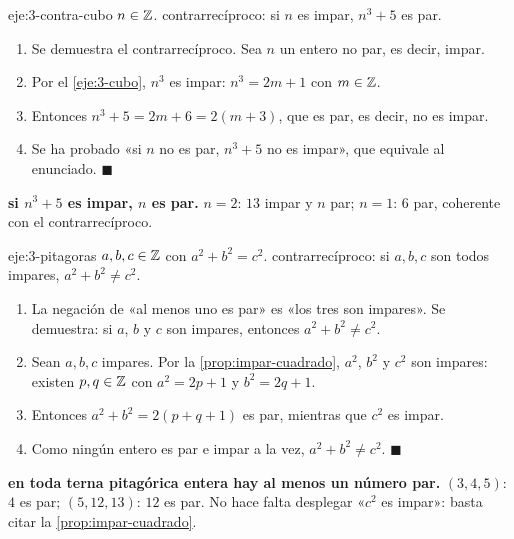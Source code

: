 \begin{solucion}{eje:3-contra-cubo}
\datos $n\in\mathbb{Z}$.
\planteamiento contrarrecíproco: si $n$ es impar, $n^{3}+5$ es par.
\pasos
\begin{enumerate}[label=\arabic*.]
  \item Se demuestra el contrarrecíproco. Sea $n$ un entero no par, es decir, impar.
  \item Por el \cref{eje:3-cubo}, $n^{3}$ es impar: $n^{3}=2m+1$ con $m\in\mathbb{Z}$.
  \item Entonces $n^{3}+5=2m+6=2(m+3)$, que es par, es decir, no es impar.
  \item Se ha probado «si $n$ no es par, $n^{3}+5$ no es impar», que equivale al enunciado. $\blacksquare$
\end{enumerate}
\resultado \textbf{si $n^{3}+5$ es impar, $n$ es par.}
\comprobacion $n=2$: $13$ impar y $n$ par; $n=1$: $6$ par, coherente con el contrarrecíproco.
\end{solucion}

\begin{solucion}{eje:3-pitagoras}
\datos $a,b,c\in\mathbb{Z}$ con $a^{2}+b^{2}=c^{2}$.
\planteamiento contrarrecíproco: si $a,b,c$ son todos impares, $a^{2}+b^{2}\neq c^{2}$.
\pasos
\begin{enumerate}[label=\arabic*.]
  \item La negación de «al menos uno es par» es «los tres son impares». Se demuestra: si $a$, $b$ y $c$ son impares, entonces $a^{2}+b^{2}\neq c^{2}$.
  \item Sean $a,b,c$ impares. Por la \cref{prop:impar-cuadrado}, $a^{2}$, $b^{2}$ y $c^{2}$ son impares: existen $p,q\in\mathbb{Z}$ con $a^{2}=2p+1$ y $b^{2}=2q+1$.
  \item Entonces $a^{2}+b^{2}=2(p+q+1)$ es par, mientras que $c^{2}$ es impar.
  \item Como ningún entero es par e impar a la vez, $a^{2}+b^{2}\neq c^{2}$. $\blacksquare$
\end{enumerate}
\resultado \textbf{en toda terna pitagórica entera hay al menos un número par.}
\comprobacion $(3,4,5)$: $4$ es par; $(5,12,13)$: $12$ es par. No hace falta desplegar «$c^{2}$ es impar»: basta citar la \cref{prop:impar-cuadrado}.
\end{solucion}

